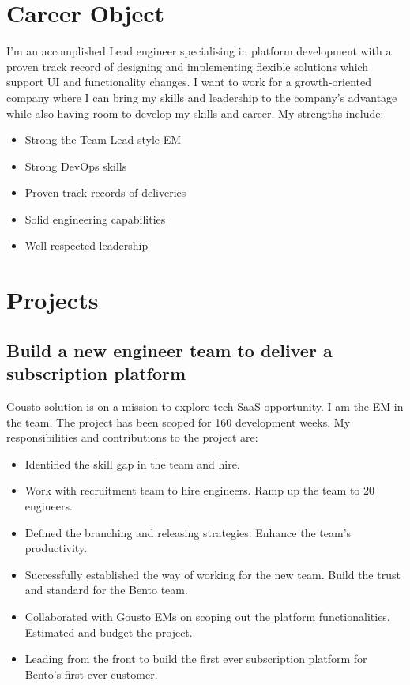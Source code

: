 \documentclass[a4paper]{twentysecondcv-english} %
\begin{document}
\section{Career Object}

I'm an accomplished Lead engineer specialising in platform development with a proven track record of designing and implementing flexible solutions which support UI and functionality changes. I want to work for a growth-oriented company where I can bring my skills and leadership to the company's advantage while also having room to develop my skills and career. My strengths include:
\begin{itemize}
  \item Strong the Team Lead style EM
  \item Strong DevOps skills
  \item Proven track records of deliveries
  \item Solid engineering capabilities
  \item Well-respected leadership
\end{itemize}

\section{Projects}

\subsection{Build a new engineer team to deliver a subscription platform}

Gousto solution is on a mission to explore tech SaaS opportunity. I am the EM in the team. The project has been scoped for 160 development weeks. My responsibilities and contributions to the project are:
\begin{itemize}
    \item Identified the skill gap in the team and hire.
    \item Work with recruitment team to hire engineers. Ramp up the team to 20 engineers.
    \item Defined the branching and releasing strategies. Enhance the team's productivity.
    \item Successfully established the way of working for the new team. Build the trust and standard for the Bento team.
    \item Collaborated with Gousto EMs on scoping out the platform functionalities. Estimated and budget the project.
    \item Leading from the front to build the first ever subscription platform for Bento's first ever customer.
\end{itemize}
\end{document}
